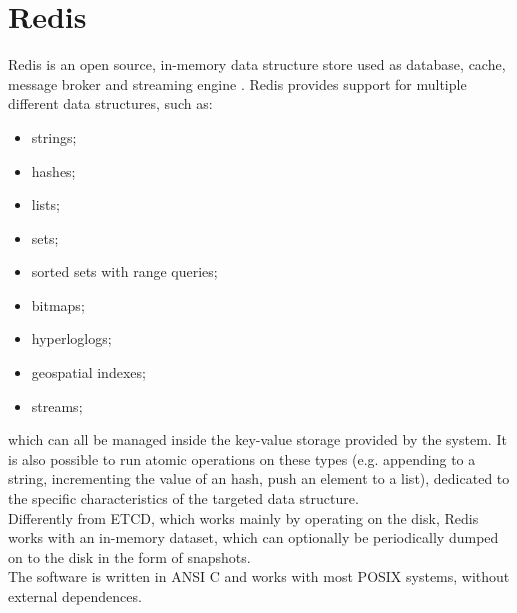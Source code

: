 \section{Redis}
Redis is an open source, in-memory data structure store used as database, cache, message broker and streaming engine \cite{site:redis-doc}. Redis provides support for multiple different data structures, such as:
\begin{itemize}
	\item strings;
	\item hashes;
	\item lists;
	\item sets;
	\item sorted sets with range queries;
	\item bitmaps;
	\item hyperloglogs;
	\item geospatial indexes;
	\item streams;
\end{itemize}
which can all be managed inside the key-value storage provided by the system. It is also possible to run atomic operations on these types (e.g. appending to a string, incrementing the value of an hash, push an element to a list), dedicated to the specific characteristics of the targeted data structure. \\
Differently from ETCD, which works mainly by operating on the disk, Redis works with an in-memory dataset, which can optionally be periodically dumped on to the disk in the form of snapshots. \\
The software is written in ANSI C and works with most POSIX systems, without external dependences.

